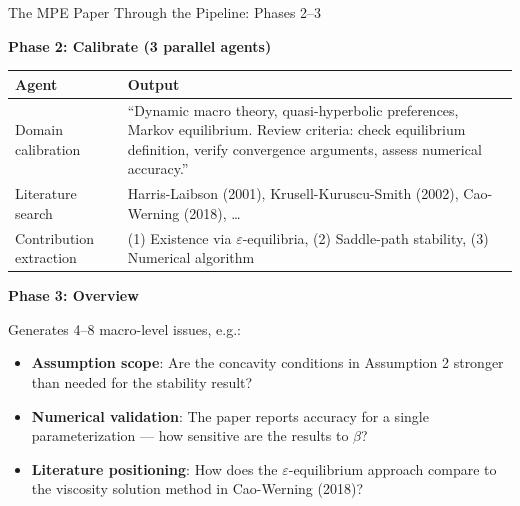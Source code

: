 \documentclass[10pt,english,aspectratio=169]{beamer}
\begin{document}
\begin{frame}{The MPE Paper Through the Pipeline: Phases 2--3}

\textbf{Phase 2: Calibrate (3 parallel agents)}

\vspace{0.1cm}
\begin{small}
\begin{tabular}{lp{9cm}}
\toprule
\textbf{Agent} & \textbf{Output} \\
\midrule
Domain calibration & ``Dynamic macro theory, quasi-hyperbolic preferences, Markov equilibrium. Review criteria: check equilibrium definition, verify convergence arguments, assess numerical accuracy.'' \\
Literature search & Harris-Laibson (2001), Krusell-Kuruscu-Smith (2002), Cao-Werning (2018), \ldots \\
Contribution extraction & (1) Existence via $\varepsilon$-equilibria, (2) Saddle-path stability, (3) Numerical algorithm \\
\bottomrule
\end{tabular}
\end{small}

\vspace{0.3cm}
\textbf{Phase 3: Overview}

Generates 4--8 macro-level issues, e.g.:
\begin{itemize}
    \item \textbf{Assumption scope}: Are the concavity conditions in Assumption 2 stronger than needed for the stability result?
    \item \textbf{Numerical validation}: The paper reports accuracy for a single parameterization --- how sensitive are the results to $\beta$?
    \item \textbf{Literature positioning}: How does the $\varepsilon$-equilibrium approach compare to the viscosity solution method in Cao-Werning (2018)?
\end{itemize}

\end{frame}
\end{document}
